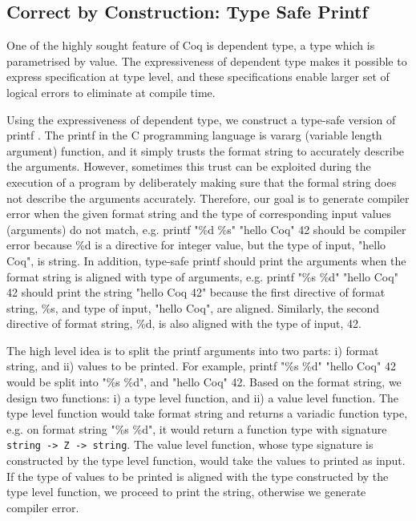  \subsection{Correct by Construction: Type Safe Printf}
 \label{sec:deplambda}
  One of the highly sought feature of Coq is dependent type, 
  a type which is parametrised by value.  
  The expressiveness of dependent type makes it possible
  to express specification at type level,  and these specifications enable larger 
  set of  logical errors to eliminate at compile time. 
  
 
 Using the expressiveness of dependent type, we construct a type-safe version of 
 printf \citep{Pierce:2004:ATT:1076265}.  
The printf in the C programming language is vararg (variable length argument) function, 
and it simply trusts the format string to accurately describe the arguments.  However, 
sometimes this trust can be exploited during the execution of a program by deliberately 
making sure that  the formal string does not describe the arguments accurately.  Therefore,
 our goal is to generate compiler error when the given format string and the type of 
 corresponding input values (arguments)  
 do not match,  e.g. printf "\%d \%s" "hello Coq" 42 should be compiler error because
 \%d is a directive for integer value,  but the type of input, "hello Coq", is string.  In addition, 
 type-safe printf should print the arguments when the format string is aligned with type of arguments, e.g.
 printf "\%s \%d" "hello Coq" 42 should print the string "hello Coq  42" because the first directive 
 of format string, \%s, and type of input, "hello Coq", are aligned. Similarly, the second directive 
 of format string, \%d, is also aligned with the type of input, 42.
 
 The high level idea is to split the printf arguments into two parts: i) format string, 
 and ii) values to be printed. For example, printf "\%s \%d" "hello Coq" 42 would be split into "\%s \%d", and 
 "hello Coq" 42.  Based on the format string, we design two functions: i) a type level function, 
 and ii) a value level function. The type level function would 
 take format string and returns a variadic function type, e.g. 
 on format string "\%s \%d", it would return a function type with 
 signature \texttt{string -> Z  -> string}.
 The value level function, whose type signature 
 is constructed by the type level function, would take the values to printed as input. If the 
 type of values to be printed is aligned with the type constructed by the type level function,
 we proceed to print the string, otherwise we generate compiler error.  
 


